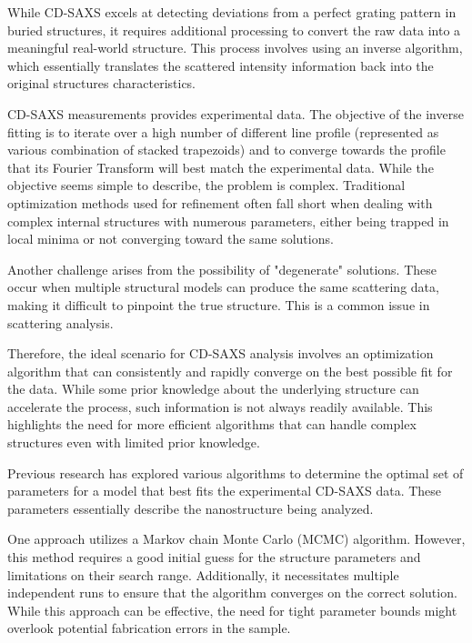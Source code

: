 While CD-SAXS excels at detecting deviations from a perfect grating pattern in buried structures, it requires 
additional processing to convert the raw data into a meaningful real-world structure. This process involves using 
an inverse algorithm, which essentially translates the scattered intensity information back into the original structures 
characteristics.

\medskip

CD-SAXS measurements provides experimental data. The objective of the inverse fitting is to iterate over a high number of different line profile (represented as various combination of stacked trapezoids)
and to converge towards the profile that its Fourier Transform will best match the experimental data. While the objective seems simple to describe, 
the problem is complex. Traditional optimization methods used for refinement often fall short when dealing with 
complex internal structures with numerous parameters, either being trapped in local minima or not converging toward the same solutions.

\medskip

Another challenge arises from the possibility of "degenerate" solutions. These occur when multiple structural 
models can produce the same scattering data, making it difficult to pinpoint the true structure. This is a common 
issue in scattering analysis.

\medskip

Therefore, the ideal scenario for CD-SAXS analysis involves an optimization algorithm that can consistently and 
rapidly converge on the best possible fit for the data. While some prior knowledge about the underlying structure 
can accelerate the process, such information is not always readily available. This highlights the need for more 
efficient algorithms that can handle complex structures even with limited prior knowledge.

\medskip

Previous research has explored various algorithms to determine the optimal set of parameters for a model that 
best fits the experimental CD-SAXS data. These parameters essentially describe the nanostructure 
being analyzed.

\medskip

One approach utilizes a Markov chain Monte Carlo (MCMC) algorithm. However, this method requires a good initial 
guess for the structure parameters and limitations on their search range. Additionally, it necessitates multiple 
independent runs to ensure that the algorithm converges on the correct solution. While this approach can be effective, 
the need for tight parameter bounds might overlook potential fabrication errors in the sample.

